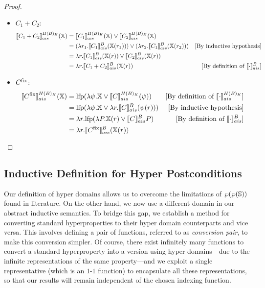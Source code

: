 \documentclass[
  10pt,       %
  twoside,    %
  a4paper,    %
  english,    %
  tikz,       %
  openright,  %
]{book}
\begin{document}
\begin{proof}
\begin{itemize}
    \item $C_1 + C_2$:
      \begin{align*}
        \asem[H(B)_K]{C_1 + C_2}(\chi)
          &= \asem[H(B)_K]{C_1}(\chi) \lor \asem[H(B)_K]{C_2}(\chi) \\
          &= (\lambda r_1 . \asem[B]{C_1}(\chi(r_1))) \lor (\lambda r_2 . \asem[B]{C_1}(\chi(r_2)))
          &\text{[By inductive hypothesis]} \\
          &= \lambda r . \asem[B]{C_1}(\chi(r)) \lor \asem[B]{C_2}(\chi(r)) \\
          &= \lambda r . \asem[B]{C_1 + C_2}(\chi(r))
          &\text{[By definition of $\asem[B]{\cdot}$]} \\
      \end{align*}

    \item $C^\fix$:
      \begin{align*}
        \asem[H(B)_K]{C^\fix}(\chi)
          &= \lfp(\lambda \psi . \chi \lor \asem[H(B)_K]{C}(\psi))
          &\text{[By definition of $\asem[H(B)_K]{\cdot}$]} \\
          &= \lfp(\lambda \psi . \chi \lor \lambda r . \asem[B]{C}(\psi(r)))
          &\text{[By inductive hypothesis]} \\
          &= \lambda r . \lfp(\lambda P . \chi(r) \lor \asem[B]{C} P)
          &\text{[By definition of $\asem[B]{\cdot}$]} \\
          &= \lambda r . \asem[B]{C^\fix}(\chi(r))
      \end{align*}
  \end{itemize}
\end{proof}


\subsection{Inductive Definition for Hyper Postconditions}

Our definition of hyper domains allows us to overcome the limitations of
$\pow{\pow{\states}}$ found in literature. On the other hand, we 
now use a different domain in our abstract inductive
semantics. To bridge this gap, we establish a method for converting standard
hyperproperties to their hyper domain counterparts and vice versa. This
involves defining a pair of functions, referred to as \emph{conversion pair},
to make this conversion simpler. Of course, there exist infinitely many functions
to convert a standard hyperproperty into a version using hyper domains---due to
the infinite representations of the same property---and we exploit a single
representative (which is an $1$-$1$ function) to encapsulate all these representations, 
so that
our results will remain independent of the chosen indexing function.
\end{document}
